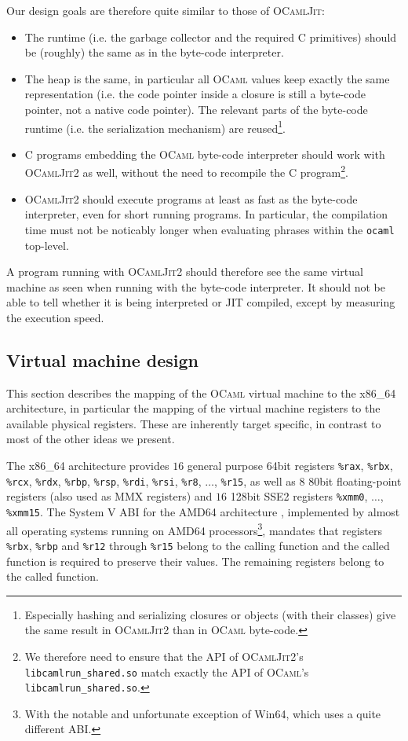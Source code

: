 \documentclass[10pt,a4paper,twocolumn]{article}
\begin{document}
Our design goals are therefore quite similar to those of \textsc{OCamlJit}:
\begin{itemize}
\item The runtime (i.e. the garbage collector and the required C primitives) should be 
  (roughly) the same as in the byte-code interpreter.
\item The heap is the same, in particular all \textsc{OCaml} values keep exactly the same representation
  (i.e. the code pointer inside a closure is still a byte-code pointer, not a native code pointer). The
  relevant parts of the byte-code runtime (i.e. the serialization mechanism) are reused\footnote{Especially
    hashing and serializing closures or objects (with their classes) give the same result
    in \textsc{OCamlJit2} than in \textsc{OCaml} byte-code.}.
\item C programs embedding the \textsc{OCaml} byte-code interpreter should work with \textsc{OCamlJit2}
  as well, without the need to recompile the C program\footnote{We therefore need to ensure that the
    API of \textsc{OCamlJit2}'s \texttt{libcamlrun\_shared.so} match exactly the API of \textsc{OCaml}'s
    \texttt{libcamlrun\_shared.so}.}.
\item \textsc{OCamlJit2} should execute programs at least as fast as the byte-code interpreter,
  even for short running programs. In particular, the compilation time must not be noticably
  longer when evaluating phrases within the \texttt{ocaml} top-level.
\end{itemize}
A program running with \textsc{OCamlJit2} should therefore see the same virtual machine as seen when
running with the byte-code interpreter. It should not be able to tell whether it is being interpreted
or JIT compiled, except by measuring the execution speed.

\subsection{Virtual machine design} \label{subsection:Virtual_machine_design}

This section describes the mapping of the \textsc{OCaml} virtual machine to the x86\_64 architecture,
in particular the mapping of the virtual machine registers to the available physical registers. These
are inherently target specific, in contrast to most of the other ideas we present.

The x86\_64 architecture \cite{Intel10Vol1} provides $16$ general purpose 64bit registers \texttt{\%rax},
\texttt{\%rbx}, \texttt{\%rcx}, \texttt{\%rdx}, \texttt{\%rbp}, \texttt{\%rsp}, \texttt{\%rdi}, \texttt{\%rsi},
\texttt{\%r8}, $\ldots$, \texttt{\%r15}, as well as $8$ 80bit floating-point registers (also used
as MMX registers) and $16$ 128bit SSE2 registers \texttt{\%xmm0}, $\ldots$, \texttt{\%xmm15}.
The System V ABI for the AMD64 architecture \cite{Matz10}, implemented by almost all operating
systems running on AMD64 processors\footnote{With the notable and unfortunate exception of
Win64, which uses a quite different ABI.}, mandates that registers \texttt{\%rbx}, \texttt{\%rbp}
and \texttt{\%r12} through \texttt{\%r15} belong to the calling function and the called function is 
required to preserve their values. The remaining registers belong to the called function.
\end{document}
